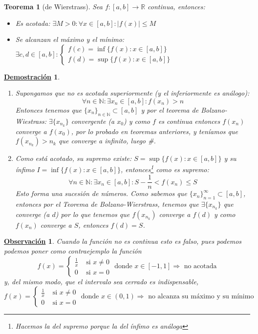 \documentclass[10pt,a4paper,openright]{book}
\theoremstyle{break}
\newtheorem{theo}{Teorema}[chapter]
\newtheorem*{demo}{\underline{Demostración}}
\newtheorem{obs}{\underline{Observación}}[chapter]
\begin{document}
\begin{theo}[de Wierstrass]
Sea $f:[a,b] \rightarrow \mathbb R$ continua, entonces:
\begin{itemize}
\item Es acotada: $\exists M>0: \forall x\in [a,b]: |f(x)|\leq M$

\item Se alcanzan el máximo y el mínimo: $\exists c,d\in [a,b]: \begin{cases} f(c)=\inf\{f(x): x\in [a,b]\} \\ f(d)=\sup\{f(x): x\in [a,b]\}\end{cases}$
\end{itemize}
\end{theo}
\begin{demo}
\begin{enumerate}
\item Supongamos que no es acotada superiormente (y el inferiormente es análogo):
$$\forall n\in \mathbb N: \exists x_n\in [a,b]: f(x_n)>n$$
Entonces tenemos que $\{x_n\}_{n\in \mathbb N}\subset [a,b]$ y por el teorema de Bolzano-Wiestrass: $\exists \{x_{n_k}\}$ convergente (a $x_0$) y como $f$ es continua entonces $f(x_n)$ converge a $f(x_0)$, por lo probado en teoremas anteriores, y teníamos que $f(x_{n_k})>n_k$ que converge a infinito, luego \#.

\item Como está acotado, su supremo existe: $S=\sup\{f(x): x\in [a,b]\}$ y su ínfimo $I=\inf\{f(x): x\in [a,b]\}$, entonces\footnote{Hacemos la del supremo porque la del ínfimo es análoga} como es supremo:
$$\forall n\in \mathbb N: \exists x_n\in [a,b]: S-\frac{1}{n}<f(x_n)\leq S$$
Esto forma una sucesión de números. Como sabemos que $\{x_n\}_{n=1}^\infty\subset[a,b]$, entonces por el Teorema de Bolzano-Wierstrass, tenemos que $\exists \{x_{n_k}\}$ que converge (a $d$) por lo que tenemos que $f(x_{n_k})$ converge a $f(d)$ y como $f(x_n)$ converge a $S$, entonces $f(d)=S$.
\end{enumerate}
\end{demo}

\begin{obs}
Cuando la función no es continua esto es falso, pues podemos podemos poner como contraejemplo la función 
\[
f(x)=\begin{cases} \frac{1}{x} & \mbox{ si }x\neq 0 \\ 0 &\mbox{ si }x=0\end{cases} \mbox{ donde }x\in [-1,1]\Rightarrow \mbox{ no acotada}
\]
y, del mismo modo, que el intervalo sea cerrado es indispensable, 
\[
f(x)=\begin{cases} \frac{1}{x} & \mbox{ si }x\neq 0 \\ 0 &\mbox{ si }x=0\end{cases} \mbox{ donde }x\in (0,1)\Rightarrow \mbox{ no alcanza su máximo y su mínimo}
\]
\end{obs}
\end{document}
